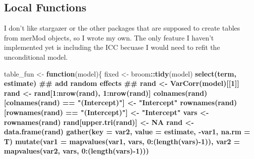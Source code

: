 \documentclass[]{article}
\newenvironment{Shaded}{\begin{snugshade}}{\end{snugshade}}
\newcommand{\KeywordTok}[1]{\textcolor[rgb]{0.13,0.29,0.53}{\textbf{#1}}}
\newcommand{\DataTypeTok}[1]{\textcolor[rgb]{0.13,0.29,0.53}{#1}}
\newcommand{\DecValTok}[1]{\textcolor[rgb]{0.00,0.00,0.81}{#1}}
\newcommand{\StringTok}[1]{\textcolor[rgb]{0.31,0.60,0.02}{#1}}
\newcommand{\OtherTok}[1]{\textcolor[rgb]{0.56,0.35,0.01}{#1}}
\newcommand{\ControlFlowTok}[1]{\textcolor[rgb]{0.13,0.29,0.53}{\textbf{#1}}}
\newcommand{\OperatorTok}[1]{\textcolor[rgb]{0.81,0.36,0.00}{\textbf{#1}}}
\newcommand{\NormalTok}[1]{#1}
\begin{document}
\subsection{Local Functions}\label{local-functions}

I don't like stargazer or the other packages that are supposed to create
tables from merMod objects, so I wrote my own. The only feature I
haven't implemented yet is including the ICC becuase I would need to
refit the unconditional model.

\begin{Shaded}
\begin{Highlighting}[]
\NormalTok{table_fun <-}\StringTok{ }\ControlFlowTok{function}\NormalTok{(model)\{}
\NormalTok{  fixed <-}\StringTok{ }\NormalTok{broom}\OperatorTok{::}\KeywordTok{tidy}\NormalTok{(model) }\OperatorTok{%>%}\StringTok{ }\KeywordTok{filter}\NormalTok{(group }\OperatorTok{==}\StringTok{ "fixed"}\NormalTok{) }\OperatorTok{%>%}
\StringTok{    }\KeywordTok{select}\NormalTok{(term, estimate) }
\NormalTok{  ## add random effects ##}
\NormalTok{  rand <-}\StringTok{ }\KeywordTok{VarCorr}\NormalTok{(model)[[}\DecValTok{1}\NormalTok{]]}
\NormalTok{  rand <-}\StringTok{ }\NormalTok{rand[}\DecValTok{1}\OperatorTok{:}\KeywordTok{nrow}\NormalTok{(rand), }\DecValTok{1}\OperatorTok{:}\KeywordTok{nrow}\NormalTok{(rand)]}
  \KeywordTok{colnames}\NormalTok{(rand)[}\KeywordTok{colnames}\NormalTok{(rand) }\OperatorTok{==}\StringTok{ "(Intercept)"}\NormalTok{] <-}\StringTok{ "Intercept"}
  \KeywordTok{rownames}\NormalTok{(rand)[}\KeywordTok{rownames}\NormalTok{(rand) }\OperatorTok{==}\StringTok{ "(Intercept)"}\NormalTok{] <-}\StringTok{ "Intercept"}
\NormalTok{  vars <-}\StringTok{ }\KeywordTok{rownames}\NormalTok{(rand)}
\NormalTok{  rand[}\KeywordTok{upper.tri}\NormalTok{(rand)] <-}\StringTok{ }\OtherTok{NA}
\NormalTok{  rand <-}\StringTok{ }\KeywordTok{data.frame}\NormalTok{(rand) }\OperatorTok{%>%}\StringTok{ }\KeywordTok{mutate}\NormalTok{(}\DataTypeTok{var1 =} \KeywordTok{rownames}\NormalTok{(.)) }\OperatorTok{%>%}
\StringTok{    }\KeywordTok{gather}\NormalTok{(}\DataTypeTok{key =}\NormalTok{ var2, }\DataTypeTok{value =}\NormalTok{ estimate, }\OperatorTok{-}\NormalTok{var1, }\DataTypeTok{na.rm =}\NormalTok{ T) }\OperatorTok{%>%}
\StringTok{    }\KeywordTok{mutate}\NormalTok{(}\DataTypeTok{var1 =} \KeywordTok{mapvalues}\NormalTok{(var1, vars, }\DecValTok{0}\OperatorTok{:}\NormalTok{(}\KeywordTok{length}\NormalTok{(vars)}\OperatorTok{-}\DecValTok{1}\NormalTok{)),}
           \DataTypeTok{var2 =} \KeywordTok{mapvalues}\NormalTok{(var2, vars, }\DecValTok{0}\OperatorTok{:}\NormalTok{(}\KeywordTok{length}\NormalTok{(vars)}\OperatorTok{-}\DecValTok{1}\NormalTok{))) }\OperatorTok{%>%}
}}}}
\end{Highlighting}
\end{Shaded}
\end{document}
